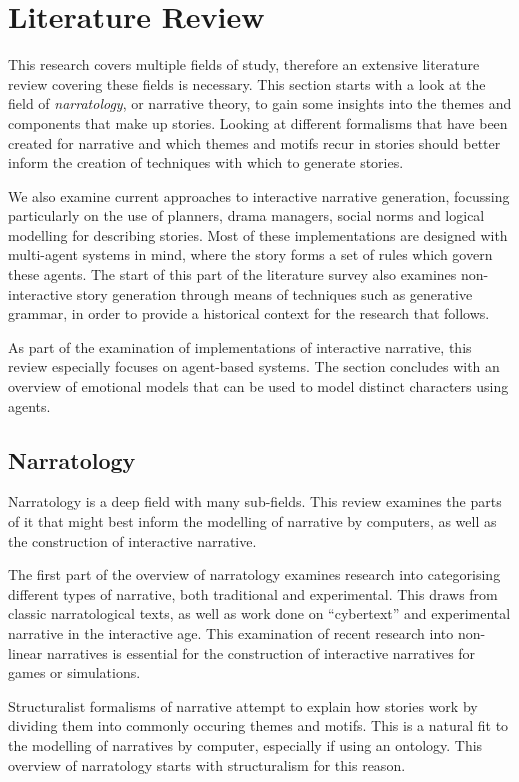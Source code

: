 \chapter{Literature Review}
\label{cha:literature-review}

This research covers multiple fields of study, therefore an extensive
literature review covering these fields is necessary. This section starts with a
look at the field of \emph{narratology}, or narrative theory, to gain some
insights into the themes and components that make up stories. Looking at
different formalisms that have been created for narrative and which themes and
motifs recur in stories should better inform the creation of techniques with
which to generate stories.

We also examine current approaches to interactive narrative generation,
focussing particularly on the use of planners, drama managers, social norms and
logical modelling for describing stories. Most of these implementations are
designed with multi-agent systems in mind, where the story forms a set of rules
which govern these agents. The start of this part of the literature survey also
examines non-interactive story generation through means of techniques such as
generative grammar, in order to provide a historical context for the research
that follows. 

As part of the examination of implementations of interactive narrative, this review especially focuses on agent-based systems. The section concludes with an overview of emotional models that can be used to model distinct characters using agents.

\section{Narratology}
\label{sec:narratology}
Narratology is a deep field with many sub-fields. This review examines the parts of it that might best inform the modelling of narrative by computers, as well as the construction of interactive narrative.

The first part of the overview of narratology examines research into categorising different types of narrative, both traditional and experimental.
This draws from classic narratological texts, as well as work done on
``cybertext'' and experimental narrative in the interactive age. This
examination of recent research into non-linear narratives is essential for the
construction of interactive narratives for games or simulations.

Structuralist formalisms of narrative attempt to explain how stories work by dividing them into commonly occuring themes and motifs. This is a natural fit to the modelling of narratives by computer, especially if using an ontology. This overview of narratology starts with structuralism for this reason.

